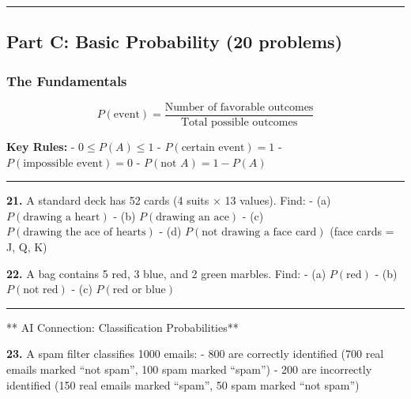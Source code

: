 \documentclass[
  11pt,
]{article}
\begin{document}
\begin{center}\rule{0.5\linewidth}{0.5pt}\end{center}

\hypertarget{part-c-basic-probability-20-problems}{%
\subsection{Part C: Basic Probability (20
problems)}\label{part-c-basic-probability-20-problems}}

\hypertarget{the-fundamentals}{%
\subsubsection{The Fundamentals}\label{the-fundamentals}}

\[P(\text{event}) = \frac{\text{Number of favorable outcomes}}{\text{Total possible outcomes}}\]

\textbf{Key Rules:} - \(0 \leq P(A) \leq 1\) -
\(P(\text{certain event}) = 1\) - \(P(\text{impossible event}) = 0\) -
\(P(\text{not } A) = 1 - P(A)\)

\begin{center}\rule{0.5\linewidth}{0.5pt}\end{center}

\textbf{21.} A standard deck has 52 cards (4 suits × 13 values). Find: -
(a) \(P(\text{drawing a heart})\) - (b) \(P(\text{drawing an ace})\) -
(c) \(P(\text{drawing the ace of hearts})\) - (d)
\(P(\text{not drawing a face card})\) (face cards = J, Q, K)

\textbf{22.} A bag contains 5 red, 3 blue, and 2 green marbles. Find: -
(a) \(P(\text{red})\) - (b) \(P(\text{not red})\) - (c)
\(P(\text{red or blue})\)

\begin{center}\rule{0.5\linewidth}{0.5pt}\end{center}

** AI Connection: Classification Probabilities**

\textbf{23.} A spam filter classifies 1000 emails: - 800 are correctly
identified (700 real emails marked ``not spam'', 100 spam marked
``spam'') - 200 are incorrectly identified (150 real emails marked
``spam'', 50 spam marked ``not spam'')
\end{document}

